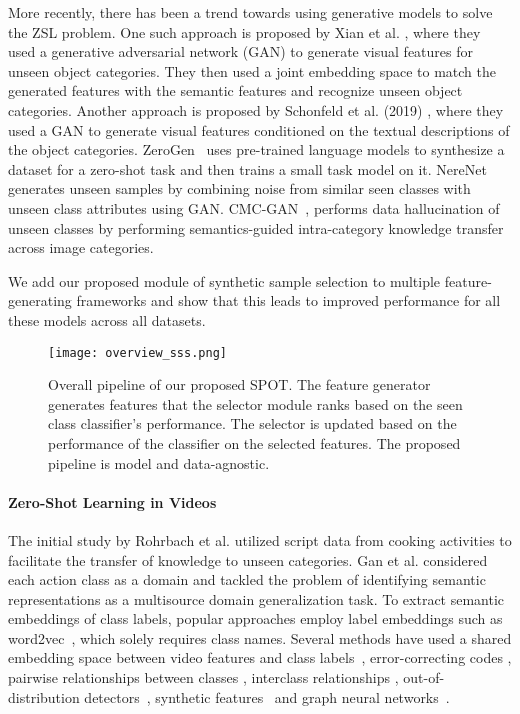 \documentclass[10pt,twocolumn,letterpaper]{article}
\begin{document}
More recently, there has been a trend towards using generative models to solve the ZSL problem. One such approach is proposed by Xian et al. \cite{clswgan}, where they used a generative adversarial network (GAN) to generate visual features for unseen object categories. They then used a joint embedding space to match the generated features with the semantic features and recognize unseen object categories. Another approach is proposed by Schonfeld et al. (2019) \cite{schonfeld2019generalized}, where they used a GAN to generate visual features conditioned on the textual descriptions of the object categories. ZeroGen~\cite{zerogen} uses pre-trained language models to synthesize a dataset for a zero-shot task and then trains a small task model on it. NereNet~\cite{nerenet} generates unseen samples by combining noise from similar seen classes with unseen class attributes using GAN. CMC-GAN~\cite{cmcnet}, performs data hallucination of unseen classes by performing semantics-guided intra-category knowledge transfer across image categories.

We add our proposed module of synthetic sample selection to multiple feature-generating frameworks and show that this leads to improved performance for all these models across all datasets.

\begin{figure*}[t]
    \centering
    \texttt{[image: overview\_sss.png]}
    \caption{Overall pipeline of our proposed SPOT. The feature generator generates features that the selector module ranks based on the seen class classifier's performance. The selector is updated based on the performance of the classifier on the selected features. The proposed pipeline is model and data-agnostic.}
    \label{fig:overview}
\end{figure*}


\paragraph{Zero-Shot Learning in Videos}

The initial study by Rohrbach et al.\cite{rohrbach12eccv} utilized script data from cooking activities to facilitate the transfer of knowledge to unseen categories. Gan et al.\cite{gan2016learning} considered each action class as a domain and tackled the problem of identifying semantic representations as a multisource domain generalization task. To extract semantic embeddings of class labels, popular approaches employ label embeddings such as word2vec~\cite{word2vec}, which solely requires class names. Several methods have used a shared embedding space between video features and class labels~\cite{xu2016multi,xu2017transductive}, error-correcting codes \cite{qin2017zero}, pairwise relationships between classes \cite{gan2016concepts}, interclass relationships \cite{gan2015exploring}, out-of-distribution detectors~\cite{OD}, synthetic features~\cite{syn, GGM2018} and graph neural networks~\cite{gao2019know}.
\end{document}
